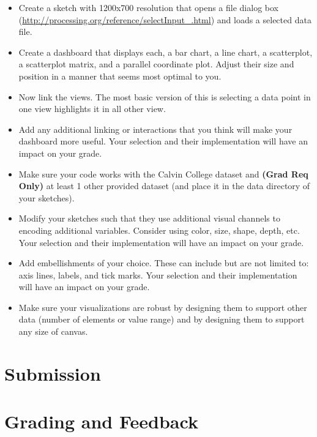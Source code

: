\documentclass[a4paper,12pt]{article}
\begin{document}
\begin{itemize}

\item Create a sketch with 1200x700 resolution that opens a file dialog box (\url{http://processing.org/reference/selectInput_.html}) and loads a selected data file. 

\item Create a dashboard that displays each, a bar chart, a line chart, a scatterplot, a scatterplot matrix, and a parallel coordinate plot. Adjust their size and position in a manner that seems most optimal to you. 

\item Now link the views. The most basic version of this is selecting a data point in one view highlights it in all other view.

\item Add any additional linking or interactions that you think will make your dashboard more useful. Your selection and their implementation will have an impact on your grade.

\item Make sure your code works with the Calvin College dataset and \textbf{(Grad Req Only)} at least 1 other provided dataset (and place it in the data directory of your sketches).

\item Modify your sketches such that they use additional visual channels to encoding additional variables. Consider using color, size, shape, depth, etc. Your selection and their implementation will have an impact on your grade.

\item Add embellishments of your choice. These can include but are not limited to: axis lines, labels, and tick marks. Your selection and their implementation will have an impact on your grade.

\item Make sure your visualizations are robust by designing them to support other data (number of elements or value range) and by designing them to support any size of canvas.

\end{itemize}


\section{Submission}


\section{Grading and Feedback}
\end{document}
